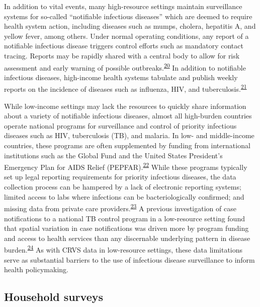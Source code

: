 \documentclass[
]{article}
\begin{document}
In addition to vital events, many high-resource settings maintain surveillance systems for so-called ``notifiable infectious diseases'' which are deemed to require health system action, including diseases such as mumps, cholera, hepatitis A, and yellow fever, among others. Under normal operating conditions, any report of a notifiable infectious disease triggers control efforts such as mandatory contact tracing. Reports may be rapidly shared with a central body to allow for risk assessment and early warning of possible outbreaks.\textsuperscript{\protect\hyperlink{ref-Vlieg2017}{20}} In addition to notifiable infectious diseases, high-income health systems tabulate and publish weekly reports on the incidence of diseases such as influenza, HIV, and tuberculosis.\textsuperscript{\protect\hyperlink{ref-Thacker1989}{21}}

While low-income settings may lack the resources to quickly share information about a variety of notifiable infectious diseases, almost all high-burden countries operate national programs for surveillance and control of priority infectious diseases such as HIV, tuberculosis (TB), and malaria. In low- and middle-income countries, these programs are often supplemented by funding from international institutions such as the Global Fund and the United States President's Emergency Plan for AIDS Relief (PEPFAR).\textsuperscript{\protect\hyperlink{ref-Mauch2010}{22}} While these programs typically set up legal reporting requirements for priority infectious diseases, the data collection process can be hampered by a lack of electronic reporting systems; limited access to labs where infections can be bacteriologically confirmed; and missing data from private care providers.\textsuperscript{\protect\hyperlink{ref-Uplekar2016}{23}} A previous investigation of case notifications to a national TB control program in a low-resource setting found that spatial variation in case notifications was driven more by program funding and access to health services than any discernable underlying pattern in disease burden.\textsuperscript{\protect\hyperlink{ref-Rood2019}{24}} As with CRVS data in low-resource settings, these data limitations serve as substantial barriers to the use of infectious disease surveillance to inform health policymaking.

\hypertarget{household-surveys}{%
\subsection{Household surveys}\label{household-surveys}}
\end{document}
